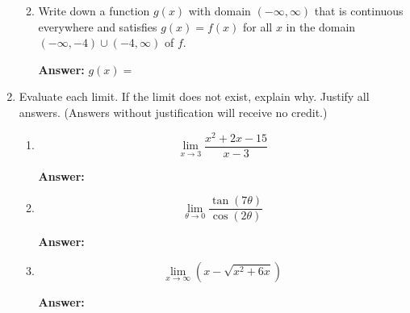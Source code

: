 \documentclass[fleqn,12pt]{article}
\newcommand{\<}{\ensuremath{\langle}}
\renewcommand{\>}{\ensuremath{\rangle}}
\begin{document}
\begin{enumerate}
\begin{enumerate}[{\it i.}]
        \bigskip

        \bigskip

      \item Write down a function $g(x)$ with domain $(-\infty, \infty)$ that is
        continuous everywhere and satisfies $g(x) = f(x)$ for all $x$ in the
        domain $(-\infty, -4) \cup (-4, \infty)$ of $f$.
        
        \bigskip

        \bigskip
        
        \hfill {\bf Answer:} $g(x) = $\phantom{XXXXXXXXXXXXXX}

      \end{enumerate}


      \newpage

    \item Evaluate each limit.  If the limit does not exist, explain why.
      Justify all answers. (Answers without justification will receive no
      credit.)

      \begin{enumerate}[{\it i.}]
      \item 
        \label{item:4i}
        \[
        \lim_{x\rightarrow 3} \frac{x^2+2x - 15}{x-3}
        \]

        \bigskip
        \hfill {\bf Answer:} \underline{\phantom{XXXXXXX}}

        \vskip4cm

      \item 
        \label{item:4ii}
        \[
        \lim_{\theta \rightarrow 0} \frac{\tan(7\theta)}{\cos(2\theta)}
        \]

        \bigskip
        \hfill {\bf Answer:} \underline{\phantom{XXXXXXX}}
  
        \vskip4cm

      \item 
        \label{item:4iii}
        \[
        \lim_{x\rightarrow \infty} (x - \sqrt{x^2 + 6x})
        \]

        \bigskip
        \hfill {\bf Answer:} \underline{\phantom{XXXXXXX}}


      \end{enumerate}

    \newpage



\end{enumerate}
\end{document}
